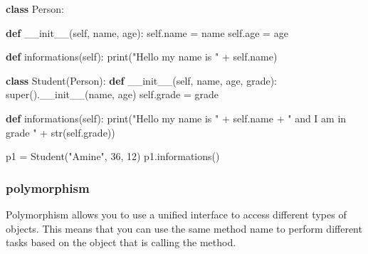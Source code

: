 \documentclass[11pt]{article}
\newenvironment{Shaded}{}{}
\newcommand{\KeywordTok}[1]{\textcolor[rgb]{0.00,0.44,0.13}{\textbf{{#1}}}}
\newcommand{\DecValTok}[1]{\textcolor[rgb]{0.25,0.63,0.44}{{#1}}}
\newcommand{\StringTok}[1]{\textcolor[rgb]{0.25,0.44,0.63}{{#1}}}
\newcommand{\FunctionTok}[1]{\textcolor[rgb]{0.02,0.16,0.49}{{#1}}}
\newcommand{\NormalTok}[1]{{#1}}
\newcommand{\VariableTok}[1]{\textcolor[rgb]{0.10,0.09,0.49}{{#1}}}
\newcommand{\OperatorTok}[1]{\textcolor[rgb]{0.40,0.40,0.40}{{#1}}}
\newcommand{\BuiltInTok}[1]{{#1}}
\begin{document}
\begin{Shaded}
\begin{Highlighting}[]
\KeywordTok{class}\NormalTok{ Person:}

    \KeywordTok{def} \FunctionTok{\_\_init\_\_}\NormalTok{(}\VariableTok{self}\NormalTok{, name, age):}
        \VariableTok{self}\NormalTok{.name }\OperatorTok{=}\NormalTok{ name}
        \VariableTok{self}\NormalTok{.age }\OperatorTok{=}\NormalTok{ age}

    \KeywordTok{def}\NormalTok{ informations(}\VariableTok{self}\NormalTok{):}
        \BuiltInTok{print}\NormalTok{(}\StringTok{"Hello my name is "} \OperatorTok{+} \VariableTok{self}\NormalTok{.name)}

\KeywordTok{class}\NormalTok{ Student(Person):}
    \KeywordTok{def} \FunctionTok{\_\_init\_\_}\NormalTok{(}\VariableTok{self}\NormalTok{, name, age, grade):}
        \BuiltInTok{super}\NormalTok{().}\FunctionTok{\_\_init\_\_}\NormalTok{(name, age)}
        \VariableTok{self}\NormalTok{.grade }\OperatorTok{=}\NormalTok{ grade}

    \KeywordTok{def}\NormalTok{ informations(}\VariableTok{self}\NormalTok{):}
        \BuiltInTok{print}\NormalTok{(}\StringTok{"Hello my name is "} \OperatorTok{+} \VariableTok{self}\NormalTok{.name }\OperatorTok{+} \StringTok{" and I am in grade "} \OperatorTok{+} \BuiltInTok{str}\NormalTok{(}\VariableTok{self}\NormalTok{.grade))}

\NormalTok{p1 }\OperatorTok{=}\NormalTok{ Student(}\StringTok{"Amine"}\NormalTok{, }\DecValTok{36}\NormalTok{, }\DecValTok{12}\NormalTok{)}
\NormalTok{p1.informations()}
\end{Highlighting}
\end{Shaded}

\subsubsection{polymorphism}\label{polymorphism}

Polymorphism allows you to use a unified interface to access different
types of objects. This means that you can use the same method name to
perform different tasks based on the object that is calling the method.
\end{document}
